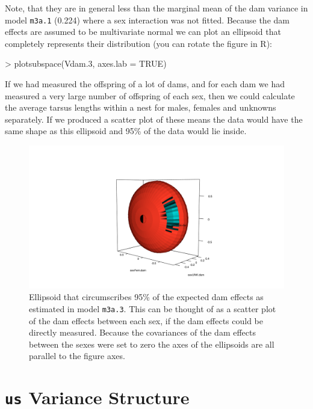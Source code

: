 \documentclass{article}
\begin{document}
Note, that they are in general less than the marginal mean of the dam variance in model \texttt{m3a.1} (0.224)  where a sex interaction was not fitted.  Because the dam effects are assumed to be multivariate normal we can plot an ellipsoid that completely represents their distribution (you can rotate the figure in R):

\begin{Schunk}
\begin{Sinput}
> plotsubspace(Vdam.3, axes.lab = TRUE)
\end{Sinput}
\end{Schunk}

If we had measured the offspring of a lot of dams, and for each dam we had measured a very large number of offspring of each sex, then we could calculate the average tarsus lengths within a nest for males, females and unknowns separately. If we produced a scatter plot of these means the data would have the same shape as this ellipsoid and 95\% of the data would lie inside.

\begin{figure}[!h]
\begin{center}
\includegraphics{rgl1.pdf}
\end{center}
\caption{Ellipsoid that circumscribes 95\% of the expected dam effects as estimated in model \texttt{m3a.3}. This can be thought of as a scatter plot of the dam effects between each sex, if the dam effects could be directly measured.  Because the covariances of the dam effects between the sexes were set to zero the axes of the ellipsoids are all parallel to the figure axes.}
\label{rgl1-fig}
\end{figure}

\section{\texttt{us} Variance Structure}
\end{document}
